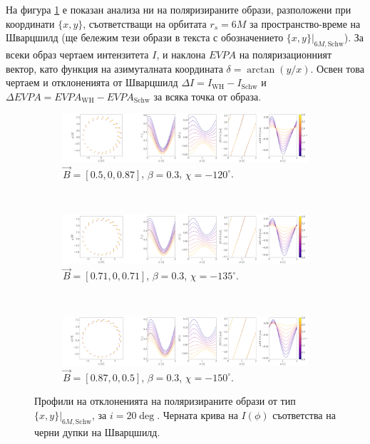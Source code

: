 На фигура \ref{WH_delta_r6} е показан анализа ни на поляризираните образи, разположени при координати $\{x,y\}$, съответстващи на орбитата $r_s = 6M$ за пространство-време на Шварцшилд (ще бележим тези образи в текста с обозначението $\{x,y\}\vert_{6M, \text{Schw}}$). За всеки образ чертаем интензитета $I$, и наклона $EVPA$ на поляризационният вектор, като функция на азимуталната координата $\delta = \arctan(y / x)$. Освен това чертаем и отклоненията от Шварцшилд $\Delta I = I_{\text{WH}} - I_{\text{Schw}}$ и $\Delta EVPA = EVPA_\text{WH} - EVPA_\text{Schw}$ за всяка точка от образа.

\begin{figure}[!htb]
	\centering
	\begin{subfigure}{12cm}
		\hspace{-2cm}
		\includegraphics[scale = 0.15]{WH_delta_fig_B_0.5_0.87_0_20_deg_r6.png}
		\caption{$\vec{B} = [0.5, 0, 0.87]$, $\beta = 0.3$, $\chi = -120^\circ$.} 
	\end{subfigure}\\
	\begin{subfigure}{12cm}
		\hspace{-2cm}
		\includegraphics[scale = 0.15]{WH_delta_fig_B_0.71_0.71_0_20_deg_r6.png}
		\caption{$\vec{B} = [0.71, 0, 0.71]$, $\beta = 0.3$, $\chi = -135^\circ$.}
	\end{subfigure}\\
	\begin{subfigure}{12cm}
		\hspace{-2cm}
		\includegraphics[scale = 0.15]{WH_delta_fig_B_0.87_0.5_0_20_deg_r6.png}
		\caption{$\vec{B} = [0.87, 0, 0.5]$, $\beta = 0.3$, $\chi = -150^\circ$.}
	\end{subfigure}
	\caption[Профили на отклоненията на поляризираните образи oт тип $\{x,y\}\vert_{6M, \text{Schw}}$, за $i = 20\deg$.]{\small Профили на отклоненията на поляризираните образи от тип $\{x,y\}\vert_{6M, \text{Schw}}$, за $i = 20\deg$. Черната крива на $I(\phi)$ съответства на черни дупки на Шварцшилд.} 
	\label{WH_delta_r6}
\end{figure}


